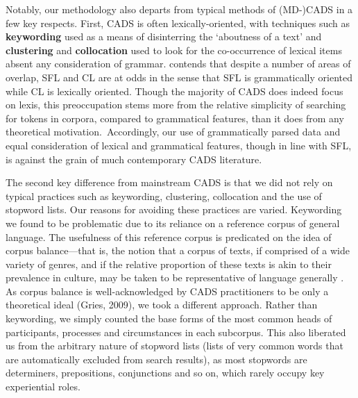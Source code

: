 		

		Notably, our methodology also departs from typical methods of (MD-)CADS in a few key respects. First, CADS is often lexically-oriented, with techniques such as \textbf{keywording} used as a means of disinterring the `aboutness of a text' \cite{baker_querying_2004} and \textbf{clustering} and \textbf{collocation} used to look for the co-occurrence of lexical items absent any consideration of grammar.  contends that despite a number of areas of overlap, SFL and CL are at odds in the sense that SFL is grammatically oriented while CL is lexically oriented. Though the majority of CADS does indeed focus on lexis, this preoccupation stems more from the relative simplicity of searching for tokens in corpora, compared to grammatical features, than it does from any theoretical motivation.~Accordingly, our use of grammatically parsed data and equal consideration of lexical and grammatical features, though in line with SFL, is against the grain of much contemporary CADS literature.

		The second key difference from mainstream CADS is that we did not rely on typical practices such as keywording, clustering, collocation and the use of stopword lists. Our reasons for avoiding these practices are varied. Keywording we found to be problematic due to its reliance on a reference corpus of general language. The usefulness of this reference corpus is predicated on the idea of corpus balance---that is, the notion that a corpus of texts, if comprised of a wide variety of genres, and if the relative proportion of these texts is akin to their prevalence in culture, may be taken to be representative of language generally \cite{chen_sinica_1996}. As corpus balance is well-acknowledged by CADS practitioners to be only a theoretical ideal (Gries, 2009), we took a different approach. Rather than keywording, we simply counted the base forms of the most common heads of participants, processes and circumstances in each subcorpus. This also liberated us from the arbitrary nature of stopword lists (lists of very common words that are automatically excluded from search results), as most stopwords are determiners, prepositions, conjunctions and so on, which rarely occupy key experiential roles.

